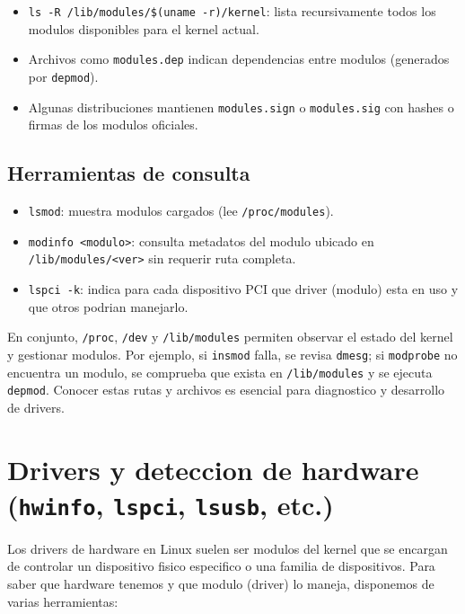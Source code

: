 \begin{itemize}
  \item \texttt{ls -R /lib/modules/\$(uname -r)/kernel}: lista recursivamente todos los modulos disponibles para el kernel actual.
  \item Archivos como \texttt{modules.dep} indican dependencias entre modulos (generados por \texttt{depmod}).
  \item Algunas distribuciones mantienen \texttt{modules.sign} o \texttt{modules.sig} con hashes o firmas de los modulos oficiales.
\end{itemize}

\subsection*{Herramientas de consulta}

\begin{itemize}
  \item \texttt{lsmod}: muestra modulos cargados (lee \texttt{/proc/modules}).
  \item \texttt{modinfo <modulo>}: consulta metadatos del modulo ubicado en \texttt{/lib/modules/<ver>} sin requerir ruta completa.
  \item \texttt{lspci -k}: indica para cada dispositivo PCI que driver (modulo) esta en uso y que otros podrian manejarlo.
\end{itemize}

En conjunto, \texttt{/proc}, \texttt{/dev} y \texttt{/lib/modules} permiten observar el estado del kernel y gestionar modulos. Por ejemplo, si \texttt{insmod} falla, se revisa \texttt{dmesg}; si \texttt{modprobe} no encuentra un modulo, se comprueba que exista en \texttt{/lib/modules} y se ejecuta \texttt{depmod}. Conocer estas rutas y archivos es esencial para diagnostico y desarrollo de drivers.

\section{Drivers y deteccion de hardware (\texttt{hwinfo}, \texttt{lspci}, \texttt{lsusb}, etc.)}

Los drivers de hardware en Linux suelen ser modulos del kernel que se encargan de controlar un dispositivo fisico especifico o una familia de dispositivos. Para saber que hardware tenemos y que modulo (driver) lo maneja, disponemos de varias herramientas:

